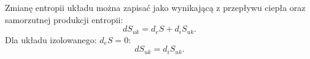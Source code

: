 \documentclass[10pt, a4paper, twoside, onecolumn]{article}
\numberwithin{equation}{section}
\newcommand{\dbar}{d\hspace*{-0.08em}\bar{}\hspace*{0.1em}}
\begin{document}
	Zmianę entropii układu można zapisać jako wynikającą z przepływu ciepła oraz samorzutnej produkcji entropii: 
	\begin{equation}
		dS_{uk}=d_{e}S+d_{i}S_{uk}.
	\end{equation}
	Dla układu izolowanego: \(d_{e}S=0\):
	\begin{equation}
		dS_{uk}=d_{i}S_{uk}.
	\end{equation}
	
	
	
\end{document}
